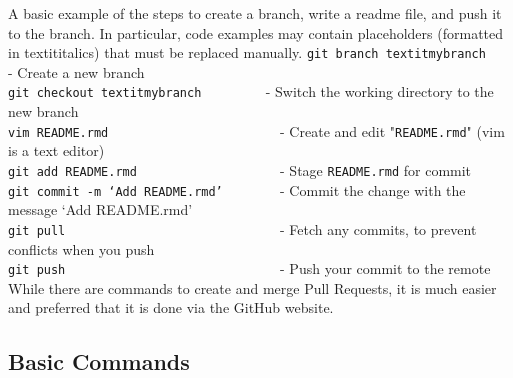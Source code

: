 \documentclass{article}
\begin{document}
A basic example of the steps to create a branch, write a readme file, and push it to the branch.
In particular, code examples may contain placeholders (formatted in textit{italics}) that must be replaced manually.
\noindent
\texttt{git branch textit{mybranch}}\verb+           +- Create a new branch \\
\texttt{git checkout textit{mybranch}}\verb+         +- Switch the working directory to the new branch\\
\texttt{vim README.rmd}\verb+                        +- Create and edit "\texttt{README.rmd}" (vim is a text editor)\\
\texttt{git add README.rmd}\verb+                    +- Stage \texttt{README.rmd} for commit\\
\texttt{git commit -m `Add README.rmd'}\verb+        +- Commit the change with the message `Add README.rmd'\\
\texttt{git pull}\verb+                              +- Fetch any commits, to prevent conflicts when you push\\
\texttt{git push}\verb+                              +- Push your commit to the remote\\

\noindent
While there are commands to create and merge Pull Requests, it is much easier and preferred that it is done via the GitHub website.

\pagebreak

\subsection{Basic Commands}
\end{document}
